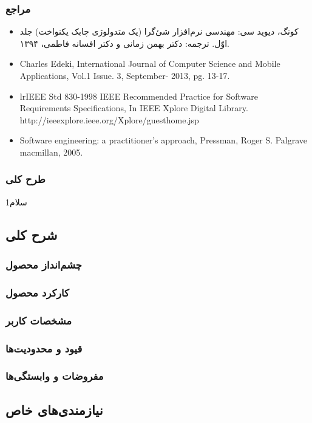 \documentclass[12pt]{article}
\begin{document}
	\subsubsection{مراجع}
	\begin{itemize}
		\item
		کونگ، دیوید سی: مهندسی نرم‌افزار شئ‌گرا (یک متدولوژی چابک یکنواخت) جلد اوّل. ترجمه: دکتر بهمن زمانی و دکتر افسانه فاطمی، ۱۳۹۴.
		\item
		Charles Edeki, International Journal of Computer Science and Mobile Applications, Vol.1 Issue. 3, September- 2013, pg. 13-17.
		\item
		{lr}{IEEE Std 830-1998 IEEE Recommended Practice for Software Requirements Specifications, In IEEE Xplore Digital Library.\\
		http://ieeexplore.ieee.org/Xplore/guesthome.jsp }
		\item
		Software engineering: a practitioner's approach, Pressman, Roger S. Palgrave macmillan, 2005.

	\end{itemize}

	\subsubsection{طرح کلی}
	سلام1

	\subsection{شرح کلی}
	\subsubsection{چشم‌انداز محصول}
	\subsubsection{کارکرد محصول}
	\subsubsection{مشخصات کاربر}
	\subsubsection{قیود و محدودیت‌ها}
	\subsubsection{مفروضات و وابستگی‌ها}

	\subsection{نیازمندی‌های خاص}
\end{document}

